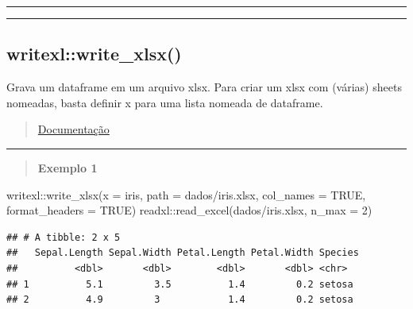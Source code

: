 \documentclass[
]{book}
\newenvironment{Shaded}{\begin{snugshade}}{\end{snugshade}}
\newcommand{\AttributeTok}[1]{\textcolor[rgb]{0.77,0.63,0.00}{#1}}
\newcommand{\ConstantTok}[1]{\textcolor[rgb]{0.00,0.00,0.00}{#1}}
\newcommand{\DecValTok}[1]{\textcolor[rgb]{0.00,0.00,0.81}{#1}}
\newcommand{\FunctionTok}[1]{\textcolor[rgb]{0.00,0.00,0.00}{#1}}
\newcommand{\NormalTok}[1]{#1}
\newcommand{\SpecialCharTok}[1]{\textcolor[rgb]{0.00,0.00,0.00}{#1}}
\newcommand{\StringTok}[1]{\textcolor[rgb]{0.31,0.60,0.02}{#1}}
\theoremstyle{definition}
\theoremstyle{definition}
\theoremstyle{definition}
\theoremstyle{definition}
\theoremstyle{remark}
\begin{document}
\begin{center}\rule{0.5\linewidth}{0.5pt}\end{center}

\begin{center}\rule{0.5\linewidth}{0.5pt}\end{center}

\hypertarget{writexlwrite_xlsx}{%
\subsection{writexl::write\_xlsx()}\label{writexlwrite_xlsx}}

Grava um dataframe em um arquivo xlsx. Para criar um xlsx com (várias) sheets nomeadas, basta definir x para uma lista nomeada de dataframe.

\begin{quote}
\href{https://www.rdocumentation.org/packages/writexl/versions/1.4.0/topics/write_xlsx}{Documentação}
\end{quote}

\begin{center}\rule{0.5\linewidth}{0.5pt}\end{center}

\begin{quote}
\textbf{Exemplo 1}
\end{quote}

\begin{Shaded}
\begin{Highlighting}[]
\NormalTok{writexl}\SpecialCharTok{::}\FunctionTok{write\_xlsx}\NormalTok{(}\AttributeTok{x =}\NormalTok{ iris,}
                    \AttributeTok{path =} \StringTok{\textquotesingle{}dados/iris.xlsx\textquotesingle{}}\NormalTok{,}
                    \AttributeTok{col\_names =} \ConstantTok{TRUE}\NormalTok{,}
                    \AttributeTok{format\_headers =} \ConstantTok{TRUE}\NormalTok{)}
\NormalTok{readxl}\SpecialCharTok{::}\FunctionTok{read\_excel}\NormalTok{(}\StringTok{\textquotesingle{}dados/iris.xlsx\textquotesingle{}}\NormalTok{, }\AttributeTok{n\_max =} \DecValTok{2}\NormalTok{)}
\end{Highlighting}
\end{Shaded}

\begin{verbatim}
## # A tibble: 2 x 5
##   Sepal.Length Sepal.Width Petal.Length Petal.Width Species
##          <dbl>       <dbl>        <dbl>       <dbl> <chr>  
## 1          5.1         3.5          1.4         0.2 setosa 
## 2          4.9         3            1.4         0.2 setosa
\end{verbatim}
\end{document}

